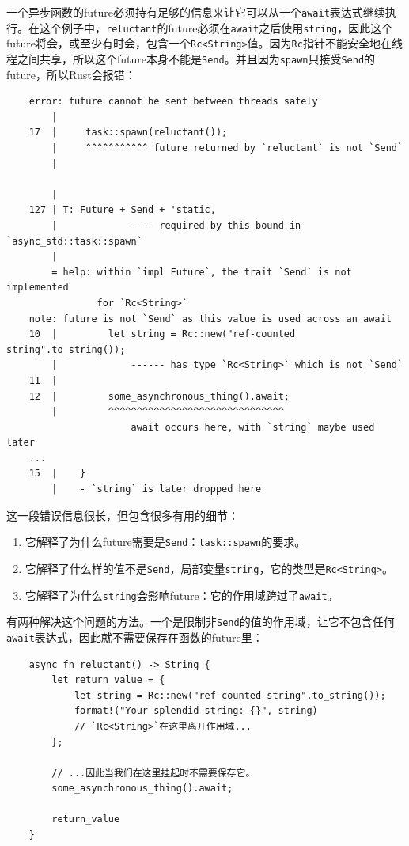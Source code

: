 一个异步函数的future必须持有足够的信息来让它可以从一个\texttt{await}表达式继续执行。在这个例子中，\texttt{reluctant}的future必须在\texttt{await}之后使用\texttt{string}，因此这个future将会，或至少有时会，包含一个\texttt{Rc<String>}值。因为\texttt{Rc}指针不能安全地在线程之间共享，所以这个future本身不能是\texttt{Send}。并且因为\texttt{spawn}只接受\texttt{Send}的future，所以Rust会报错：
\begin{verbatim}
    error: future cannot be sent between threads safely
        |
    17  |     task::spawn(reluctant());
        |     ^^^^^^^^^^^ future returned by `reluctant` is not `Send`
        |

        |
    127 | T: Future + Send + 'static,
        |             ---- required by this bound in `async_std::task::spawn`
        |
        = help: within `impl Future`, the trait `Send` is not implemented
                for `Rc<String>`
    note: future is not `Send` as this value is used across an await
    10  |         let string = Rc::new("ref-counted string".to_string());
        |             ------ has type `Rc<String>` which is not `Send`
    11  |
    12  |         some_asynchronous_thing().await;
        |         ^^^^^^^^^^^^^^^^^^^^^^^^^^^^^^^
                      await occurs here, with `string` maybe used later
    ...
    15  |    }
        |    - `string` is later dropped here
\end{verbatim}

这一段错误信息很长，但包含很多有用的细节：
\begin{enumerate}
    \item 它解释了为什么future需要是\texttt{Send}：\texttt{task::spawn}的要求。
    \item 它解释了什么样的值不是\texttt{Send}，局部变量\texttt{string}，它的类型是\texttt{Rc<String>}。
    \item 它解释了为什么\texttt{string}会影响future：它的作用域跨过了\texttt{await}。
\end{enumerate}

有两种解决这个问题的方法。一个是限制非\texttt{Send}的值的作用域，让它不包含任何\texttt{await}表达式，因此就不需要保存在函数的future里：
\begin{verbatim}
    async fn reluctant() -> String {
        let return_value = {
            let string = Rc::new("ref-counted string".to_string());
            format!("Your splendid string: {}", string)
            // `Rc<String>`在这里离开作用域...
        };

        // ...因此当我们在这里挂起时不需要保存它。
        some_asynchronous_thing().await;

        return_value
    }
\end{verbatim}

